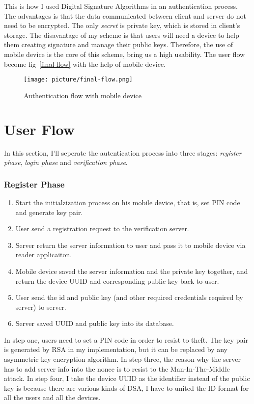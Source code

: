 \begin{CJK}{Bg5}{bsmi}
This is how I used Digital Signature Algorithms in an authentication process. The advantages is that the data communicated between client and server do not need to be encrypted. The only \emph{secret} is private key, which is stored in client's storage. The disavantage of my scheme is that users will need a device to help them creating signature and manage their public keys. Therefore, the use of mobile device is the core of this scheme, bring us a high usability. The user flow become fig~\ref{final-flow} with the help of mobile device.

\begin{figure}
\centering
\label{fig:final-flow}
\texttt{[image: picture/final-flow.png]}
\caption{Authentication flow with mobile device}
\end{figure}

\section{User Flow}

In this section, I'll seperate the autentication process into three stages: \emph{register phase}, \emph{login phase} and \emph{verification phase}.

\subsubsection{Register Phase}

\begin{enumerate}
\item Start the initialzization process on his mobile device, that is, set PIN code and generate key pair.
\item User send a registration request to the verification server.
\item Server return the server information to user and pass it to mobile device via reader applicaiton.
\item Mobile device saved the server information and the private key together, and return the device UUID and corresponding public key back to user.
\item User send the id and public key (and other required credentials required by server) to server.
\item Server saved UUID and public key into its database.
\end{enumerate}

In step one, users need to set a PIN code in order to resist to theft. The key pair is generated by RSA in my implementation, but it can be replaced by any asymmetric key encryption algorithm. In step three, the reason why the server has to add server info into the nonce is to resist to the Man-In-The-Middle attack. In step four, I take the device UUID as the identifier instead of the public key is because there are various kinds of DSA, I have to united the ID format for all the users and all the devices.


\end{CJK}
